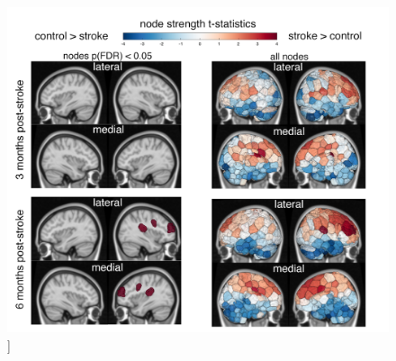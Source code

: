 \documentclass[phd,tocprelim]{cornell}
\renewcommand{\caption}[1]{\singlespacing\hangcaption{#1}\normalspacing}
\begin{document}
\begin{figure}[h!]
		\ContinuedFloat
		\captionsetup{labelformat=adja-page}
    \centering
    \includegraphics[width=\textwidth]{chapter1/SupplementaryFigure3_2.png}
    \caption[]{}
\end{figure}
\null
\vfill
\clearpage
\end{document}

